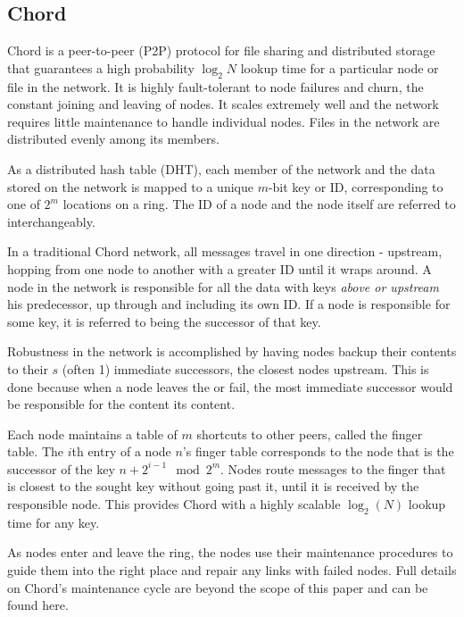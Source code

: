 \subsection{Chord}
Chord\cite{chord} is a peer-to-peer (P2P) protocol for file sharing and distributed storage that guarantees a high probability $\log_{2} N$ lookup time for a particular node or file in the network. 
It is highly fault-tolerant to node failures and churn, the constant joining and leaving of nodes.  It scales extremely well and the network requires little maintenance to handle individual nodes.  
Files in the network are distributed evenly among its members.

As a distributed hash table (DHT), each member of the network and the data stored on the network is mapped to a unique $m$-bit key or ID, corresponding to one of  $2^m$ locations on a ring. 
The ID of a node and the node itself are referred to interchangeably.

In a traditional Chord network, all messages travel in one direction - upstream, hopping from one node to another with a greater ID until it wraps around.
A node in the network is responsible for all the data with keys \textit{above or upstream} his predecessor, up through and including its own ID.  If a node is responsible for some key, it is referred to being the successor of that key.

Robustness in the network is accomplished by having nodes backup their contents to their $s$ (often 1) immediate successors, the closest nodes upstream.  
This is done because when a node leaves the or fail, the most immediate successor would be responsible for the content its content.

Each node maintains a table of $m$ shortcuts to other peers, called the finger table.   The $i$th entry of a node $n$'s finger table corresponds to the node that is the successor of the key $n+2^{i-1} \mod 2^m $.  Nodes route messages to the finger that is closest to the sought key without going past it, until it is received by the responsible node.  This provides Chord with a highly scalable $\log_2(N)$ lookup time for any key\cite{chord}.

As nodes enter and leave the ring, the nodes use their maintenance procedures to guide them into the right place and repair any links with failed nodes.  Full details on Chord's maintenance cycle are beyond the scope of this paper and can be found here\cite{chord}.

